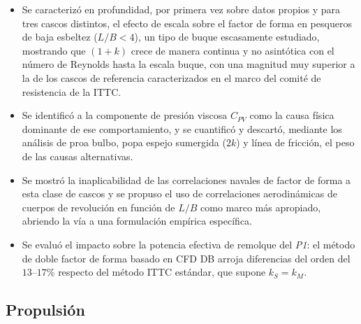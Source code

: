 \begin{itemize}
    \item Se caracterizó en profundidad, por primera vez sobre datos propios y para
    tres cascos distintos, el efecto de escala sobre el factor de forma en pesqueros de
    baja esbeltez ($L/B < 4$), un tipo de buque escasamente estudiado, mostrando que
    $(1+k)$ crece de manera continua y no asintótica con el número de Reynolds hasta
    la escala buque, con una magnitud muy superior a la de los cascos de referencia
    caracterizados en el marco del comité de resistencia de la ITTC.

    \item Se identificó a la componente de presión viscosa $C_{PV}$ como la causa
    física dominante de ese comportamiento, y se cuantificó y descartó, mediante los
    análisis de proa bulbo, popa espejo sumergida ($2k$) y línea de fricción, el
    peso de las causas alternativas.

    \item Se mostró la inaplicabilidad de las correlaciones navales de factor de forma
    a esta clase de cascos y se propuso el uso de correlaciones aerodinámicas de
    cuerpos de revolución en función de $L/B$ como marco más apropiado, abriendo la vía
    a una formulación empírica específica.

    \item Se evaluó el impacto sobre la potencia efectiva de remolque del \textit{P1}:
    el método de doble factor de forma basado en CFD DB arroja diferencias del orden
    del $13$--$17\%$ respecto del método ITTC estándar, que supone $k_S = k_M$.
\end{itemize}

\subsection*{Propulsión}

